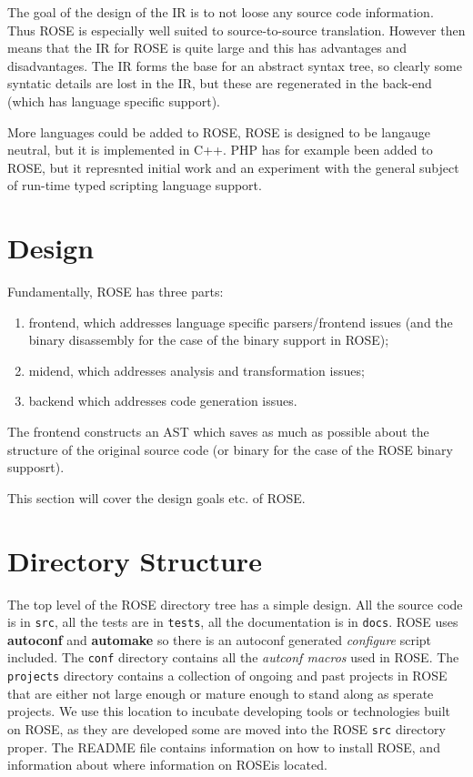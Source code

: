    The goal of the design of the IR is to not loose any source code information.
Thus ROSE is especially well suited to source-to-source translation. However
then means that the IR for ROSE is quite large and this has advantages and
disadvantages.  The IR forms the base for an abstract syntax tree, so clearly
some syntatic details are lost in the IR, but these are regenerated in the 
back-end (which has language specific support).

   More languages could be added to ROSE, ROSE is designed to be langauge
neutral, but it is implemented in C++. PHP has for example been added to 
ROSE, but it represnted initial work and an experiment with the general subject of
run-time typed scripting language support.

\section{Design}

Fundamentally, ROSE has three parts:
\begin{enumerate}
   \item frontend, which addresses language specific parsers/frontend issues (and the
         binary disassembly for the case of the binary support in ROSE);
   \item midend, which addresses analysis and transformation issues; 
   \item backend which addresses code generation issues.
\end{enumerate}

   The frontend constructs an AST which saves as much as possible about the structure of
the original source code (or binary for the case of the ROSE binary supposrt).

   This section will cover the design goals etc. of ROSE.

\section{Directory Structure}

   The top level of the ROSE directory tree has a simple design.
All the source code is in {\tt src}, all the tests are in {\tt tests},
all the documentation is in {\tt docs}.  ROSE uses {\bf autoconf} and {\bf automake}
so there is an autoconf generated {\em configure} script included.  The
{\tt conf} directory contains all the {\em autconf macros} used in ROSE.
The {\tt projects} directory contains a collection of ongoing and past
projects in ROSE that are either not large enough or mature enough to stand
along as sperate projects.  We use this location to incubate developing tools
or technologies built on ROSE, as they are developed some are moved
into the ROSE {\tt src} directory proper.  The README file contains
information on how to install ROSE, and information about where information
on ROSEis located.

